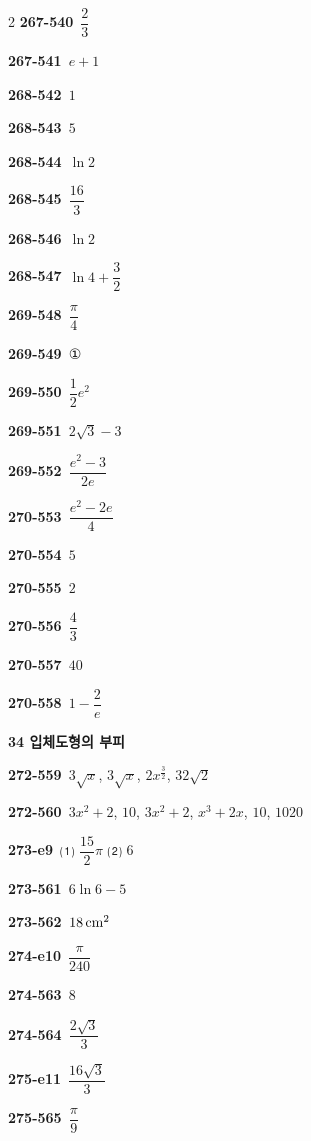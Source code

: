 \documentclass[10pt,a4paper]{article}
\begin{document}
\begin{multicols}{2}
\noindent\textbf{267-540}\ $\dfrac{2}{3}$\par
\noindent\textbf{267-541}\ $e+1$\par
\noindent\textbf{268-542}\ $1$\par
\noindent\textbf{268-543}\ $5$\par
\noindent\textbf{268-544}\ $\ln 2$\par
\noindent\textbf{268-545}\ $\dfrac{16}{3}$\par
\noindent\textbf{268-546}\ $\ln 2$\par
\noindent\textbf{268-547}\ $\ln 4+\dfrac{3}{2}$\par
\noindent\textbf{269-548}\ $\dfrac{\pi}{4}$\par
\noindent\textbf{269-549}\ ①\par
\noindent\textbf{269-550}\ $\dfrac{1}{2}e^2$\par
\noindent\textbf{269-551}\ $2\sqrt{3}-3$\par
\noindent\textbf{269-552}\ $\dfrac{e^2-3}{2e}$\par
\noindent\textbf{270-553}\ $\dfrac{e^2-2e}{4}$\par
\noindent\textbf{270-554}\ $5$\par
\noindent\textbf{270-555}\ $2$\par
\noindent\textbf{270-556}\ $\dfrac{4}{3}$\par
\noindent\textbf{270-557}\ $40$\par
\noindent\textbf{270-558}\ $1-\dfrac{2}{e}$\par
\noindent\textbf{34 입체도형의 부피}\par\smallskip
\noindent\textbf{272-559}\ $3\sqrt{x}$, $3\sqrt{x}$, $2x^{\frac{3}{2}}$, $32\sqrt{2}$\par
\noindent\textbf{272-560}\ $3x^2+2$, $10$, $3x^2+2$, $x^3+2x$, $10$, $1020$\par
\noindent\textbf{273-e9}\ ⑴ $\dfrac{15}{2}\pi$ ⑵ $6$\par
\noindent\textbf{273-561}\ $6\ln 6-5$\par
\noindent\textbf{273-562}\ $18\mkern3mu \mathrm{cm}^2$\par
\noindent\textbf{274-e10}\ $\dfrac{\pi}{240}$\par
\noindent\textbf{274-563}\ $8$\par
\noindent\textbf{274-564}\ $\dfrac{2\sqrt{3}}{3}$\par
\noindent\textbf{275-e11}\ $\dfrac{16\sqrt{3}}{3}$\par
\noindent\textbf{275-565}\ $\dfrac{\pi}{9}$\par

\end{multicols}
\end{document}
